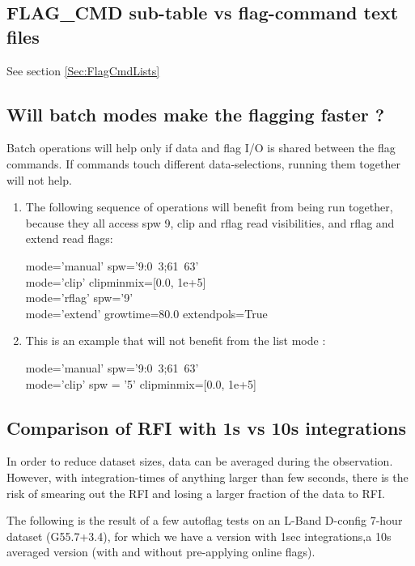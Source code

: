 \subsection{FLAG\_CMD sub-table vs flag-command text files}
See section \ref{Sec:FlagCmdLists}


\subsection{Will batch modes make the flagging faster ?}

Batch operations will help only if data and flag I/O is shared between the flag commands.  
If commands touch different data-selections, running them together will not help.

\begin{enumerate}
\item The following sequence of operations will benefit from being run together, 
because they all access spw 9, clip and rflag read visibilities, and rflag and extend read flags:

mode='manual'  spw='9:0~3;61~63' \\
mode='clip'  clipminmix=[0.0, 1e+5] \\
mode='rflag'   spw='9' \\
mode='extend'  growtime=80.0   extendpols=True 

\item This is an example that will not benefit from the list mode : 

mode='manual'  spw='9:0~3;61~63' \\
mode='clip'  spw = '5'  clipminmix=[0.0, 1e+5] 

\end{enumerate}




\subsection{Comparison of RFI with 1s vs 10s integrations}
In order to reduce dataset sizes, data can be averaged during the observation. However, with integration-times of anything larger than few seconds, there is the risk of smearing out the RFI and losing a larger fraction of the data to RFI.   

The following is the result of a few autoflag tests on an L-Band D-config 7-hour dataset (G55.7+3.4), for which we have a version with 1sec integrations,a 10s averaged version (with and without pre-applying online flags).

